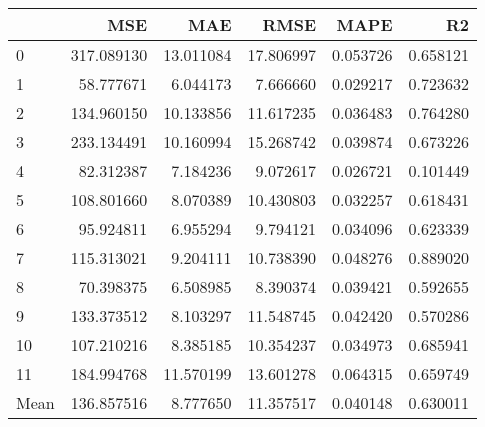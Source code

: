 \begin{tabular}{lrrrrr}
\toprule
 & MSE & MAE & RMSE & MAPE & R2 \\
\midrule
0 & 317.089130 & 13.011084 & 17.806997 & 0.053726 & 0.658121 \\
1 & 58.777671 & 6.044173 & 7.666660 & 0.029217 & 0.723632 \\
2 & 134.960150 & 10.133856 & 11.617235 & 0.036483 & 0.764280 \\
3 & 233.134491 & 10.160994 & 15.268742 & 0.039874 & 0.673226 \\
4 & 82.312387 & 7.184236 & 9.072617 & 0.026721 & 0.101449 \\
5 & 108.801660 & 8.070389 & 10.430803 & 0.032257 & 0.618431 \\
6 & 95.924811 & 6.955294 & 9.794121 & 0.034096 & 0.623339 \\
7 & 115.313021 & 9.204111 & 10.738390 & 0.048276 & 0.889020 \\
8 & 70.398375 & 6.508985 & 8.390374 & 0.039421 & 0.592655 \\
9 & 133.373512 & 8.103297 & 11.548745 & 0.042420 & 0.570286 \\
10 & 107.210216 & 8.385185 & 10.354237 & 0.034973 & 0.685941 \\
11 & 184.994768 & 11.570199 & 13.601278 & 0.064315 & 0.659749 \\
Mean & 136.857516 & 8.777650 & 11.357517 & 0.040148 & 0.630011 \\
\bottomrule
\end{tabular}
